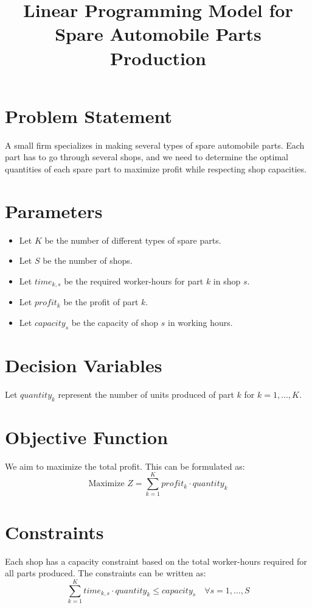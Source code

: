 \documentclass{article}
\begin{document}
\title{Linear Programming Model for Spare Automobile Parts Production}
\author{}
\date{}
\maketitle

\section*{Problem Statement}
A small firm specializes in making several types of spare automobile parts. Each part has to go through several shops, and we need to determine the optimal quantities of each spare part to maximize profit while respecting shop capacities.

\section*{Parameters}
\begin{itemize}
    \item Let \( K \) be the number of different types of spare parts.
    \item Let \( S \) be the number of shops.
    \item Let \( time_{k, s} \) be the required worker-hours for part \( k \) in shop \( s \).
    \item Let \( profit_k \) be the profit of part \( k \).
    \item Let \( capacity_s \) be the capacity of shop \( s \) in working hours.
\end{itemize}

\section*{Decision Variables}
Let \( quantity_k \) represent the number of units produced of part \( k \) for \( k = 1, \ldots, K \).

\section*{Objective Function}
We aim to maximize the total profit. This can be formulated as:
\[
\text{Maximize } Z = \sum_{k=1}^{K} profit_k \cdot quantity_k
\]

\section*{Constraints}
Each shop has a capacity constraint based on the total worker-hours required for all parts produced. The constraints can be written as:
\[
\sum_{k=1}^{K} time_{k, s} \cdot quantity_k \leq capacity_s \quad \forall s = 1, \ldots, S
\]
\end{document}
